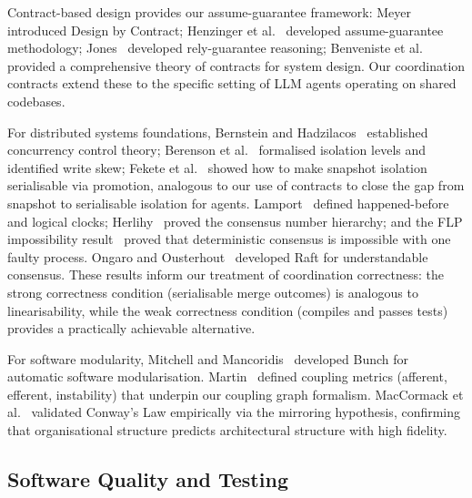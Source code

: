 \documentclass[11pt, a4paper]{googledeepmind}
\begin{document}
Contract-based design provides our assume-guarantee framework:
Meyer~\citep{meyer1992} introduced Design by Contract; Henzinger
et al.~\citep{henzinger2002} developed assume-guarantee methodology;
Jones~\citep{Jones1983} developed rely-guarantee reasoning; Benveniste
et al.~\citep{Benveniste2018} provided a comprehensive theory of contracts for
system design.  Our coordination contracts extend these to the specific setting
of LLM agents operating on shared codebases.

For distributed systems foundations, Bernstein and Hadzilacos~\citep{BernsteinHadzilacos1987} established concurrency control theory; Berenson et al.~\citep{Berenson1995} formalised isolation levels and identified write skew; Fekete et al.~\citep{Fekete2005} showed how to make snapshot isolation serialisable via promotion, analogous to our use of contracts to close the gap from snapshot to serialisable isolation for agents. Lamport~\citep{Lamport1978} defined happened-before and logical clocks; Herlihy~\citep{Herlihy1991} proved the consensus number hierarchy; and the FLP impossibility result~\citep{FLP1985} proved that deterministic consensus is impossible with one faulty process. Ongaro and Ousterhout~\citep{Ongaro2014} developed Raft for understandable consensus. These results inform our treatment of coordination correctness: the strong correctness condition (serialisable merge outcomes) is analogous to linearisability, while the weak correctness condition (compiles and passes tests) provides a practically achievable alternative.

For software modularity, Mitchell and Mancoridis~\citep{Mitchell2006bunch} developed Bunch for automatic software modularisation. Martin~\citep{Martin1994} defined coupling metrics (afferent, efferent, instability) that underpin our coupling graph formalism. MacCormack et al.~\citep{MacCormack2012} validated Conway's Law empirically via the mirroring hypothesis, confirming that organisational structure predicts architectural structure with high fidelity.


\subsection{Software Quality and Testing}
\end{document}
